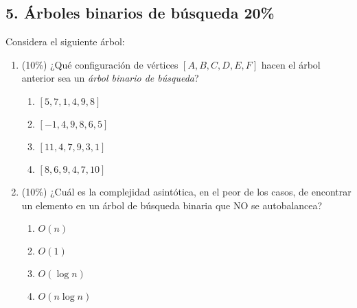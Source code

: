 \documentclass[10 pt]{article}
\begin{document}
\begin{multicols}{2}
\section{5. Árboles binarios de búsqueda 20\%}
Considera el siguiente árbol:
\begin{center}
\end{center}
\begin{enumerate}[label=\alph*]
	\item (10\%) ¿Qué configuración de vértices $[A, B, C, D, E, F]$ hacen el árbol anterior sea un \emph{árbol binario de búsqueda}?
	\begin{enumerate}[label=\roman*]
		\item $[5, 7, 1, 4, 9, 8]$
		\item $[-1, 4, 9, 8, 6, 5]$
		\item $[11, 4, 7, 9, 3, 1]$
		\item $[8, 6, 9, 4, 7, 10]$
	\end{enumerate}
	\item (10\%) ¿Cuál es la complejidad asintótica, en el peor de los casos, de encontrar un elemento en un árbol de búsqueda binaria que NO se autobalancea?
	\begin{enumerate}[label=\roman*]
		\item $O(n)$
		\item $O(1)$
		\item $O(\log n)$
		\item $O(n \log n)$
	\end{enumerate}
	
\end{enumerate}
\end{multicols}
\end{document}
